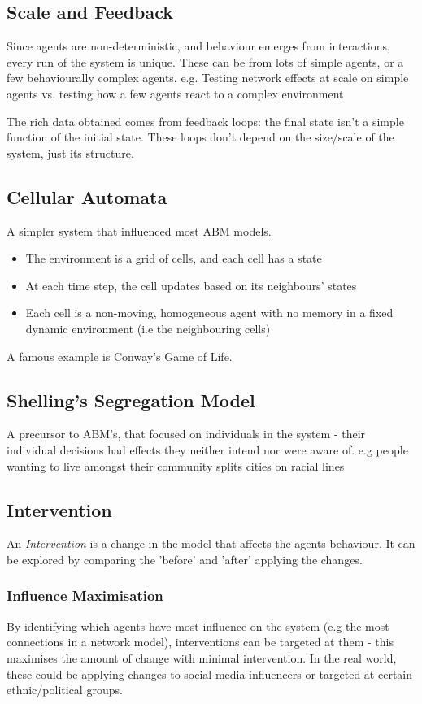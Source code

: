 \subsection{Scale and Feedback}
Since agents are non-deterministic, and behaviour emerges from interactions, every run of the system is unique. These can be from lots of simple agents, or a few behaviourally complex agents. e.g. Testing network effects at scale on simple agents vs. testing how a few agents react to a complex environment

The rich data obtained comes from feedback loops: the final state isn't a simple function of the initial state. These loops don't depend on the size/scale of the system, just its structure. 

\subsection{Cellular Automata}
A simpler system that influenced most ABM models. \begin{itemize}
    \item The environment is a grid of cells, and each cell has a state
    \item At each time step, the cell updates based on its neighbours' states
    \item Each cell is a non-moving, homogeneous agent with no memory in a fixed dynamic environment (i.e the neighbouring cells)
\end{itemize}
A famous example is Conway's Game of Life.

\subsection{Shelling's Segregation Model}
A precursor to ABM's, that focused on individuals in the system - their individual decisions had effects they neither intend nor were aware of. e.g people wanting to live amongst their community splits cities on racial lines

\subsection{Intervention}
An \emph{Intervention} is a change in the model that affects the agents behaviour. It can be explored by comparing the 'before' and 'after' applying the changes.

\subsubsection{Influence Maximisation}
By identifying which agents have most influence on the system (e.g the most connections in a network model), interventions can be targeted at them - this maximises the amount of change with minimal intervention. In the real world, these could be applying changes to social media influencers or targeted at certain ethnic/political groups.

